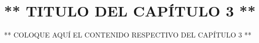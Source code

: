 \chapter{** TITULO DEL CAPÍTULO 3 **}
\thispagestyle{empty}

** COLOQUE AQUÍ EL CONTENIDO RESPECTIVO DEL CAPÍTULO 3 **